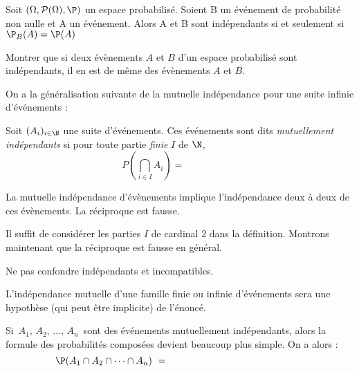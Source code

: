 \documentclass[a4paper,10pt]{report}
\begin{document}
\begin{prop}
Soit $(\Omega,\mathcal{P}(\Omega),\P)$ un espace probabilisé. Soient B un événement de probabilité non nulle et A un événement. Alors A et B sont indépendants si et seulement si $\P_B(A)=\P(A)$
\end{prop}

\begin{preuve}

\vspace{4cm}
\end{preuve}

\begin{exa} Montrer que si deux évènements $A$ et $B$ d'un espace probabilisé sont indépendants, il en est de même des évènements $A$ et $\overline{B}$.
\end{exa}



 
\noindent On a la généralisation suivante de la mutuelle indépendance pour une suite infinie d'événements :

\begin{defin}
 Soit $(A_i)_{i \in \N}$ une suite d'événements. Ces événements sont dits \textit{mutuellement indépendants} si  pour toute partie \textit{finie} $I$ de $\N$,
$$ P\left(\bigcap_{i \in I} A_i \right) = \phantom{\prod_{i\in I} P(A_i).}$$
\end{defin}

\begin{prop} La mutuelle indépendance d'évènements implique l'indépendance deux à deux de ces évènements. La réciproque est fausse.
\end{prop}

\begin{preuve} Il suffit de considérer les parties $I$ de cardinal $2$ dans la définition. Montrons maintenant que la réciproque est fausse en général. 

\vspace{5cm}
\end{preuve}

\begin{att}
 Ne pas confondre indépendants et incompatibles.
\end{att}

\medskip

\begin{rems}
 \item L'indépendance mutuelle d'une famille finie ou infinie d'événements sera une hypothèse (qui peut être implicite) de l'énoncé.
 \item Si $\,A_1,\,A_2,\,\dots,\,A_n\,$ sont des événements mutuellement indépendants, 
alors la formule des probabilités composées devient beaucoup plus simple. On a alors : 
$$ \P(A_1\cap A_2\cap \cdots\cap A_{n})\ = \phantom{ \P(A_1)\times \P(A_2)\times\cdots\times \P(A_{n})}$$
\end{rems}
\end{document}
